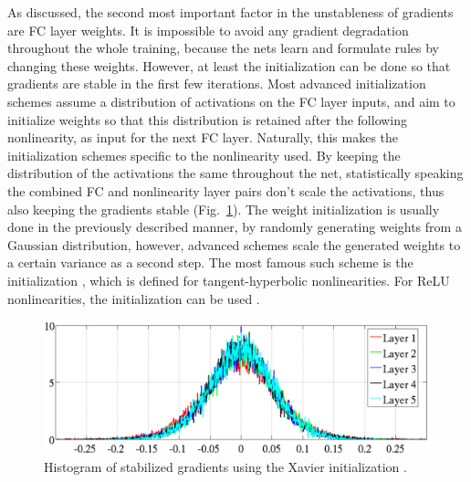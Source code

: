 			As discussed, the second most important factor in the unstableness of gradients are \ac{FC} layer weights.
			It is impossible to avoid any gradient degradation throughout the whole training, because the nets learn and formulate rules by changing these weights.
			However, at least the initialization can be done so that gradients are stable in the first few iterations.		
			Most advanced initialization schemes assume a distribution of activations on the \ac{FC} layer inputs, and aim to initialize weights so that this distribution is retained after the following nonlinearity, as input for the next \ac{FC} layer.
			Naturally, this makes the initialization schemes specific to the nonlinearity used.
			By keeping the distribution of the activations the same throughout the net, statistically speaking the combined \ac{FC} and nonlinearity layer pairs don't scale the activations, thus also keeping the gradients stable (Fig.~\ref{fig:normalized_gradients}).
			The weight initialization is usually done in the previously described manner, by randomly generating weights from a Gaussian distribution, however, advanced schemes scale the generated weights to a certain variance as a second step.
			The most famous such scheme is the  initialization \cite{deep_net_init}, which is defined for tangent-hyperbolic nonlinearities.
			For \ac{ReLU} nonlinearities, the  initialization can be used \cite{deep_net_init_relu}.
			
			\begin{figure}[ht]
				\centering
				\includegraphics[width=0.8\linewidth]{figures/02_deep_learning/normalized_gradients/normalized_gradients.png}
				\caption[Histogram of stabilized gradients]{Histogram of stabilized gradients using the Xavier initialization \cite{deep_net_init}.}
				\label{fig:normalized_gradients}
			\end{figure}
		
